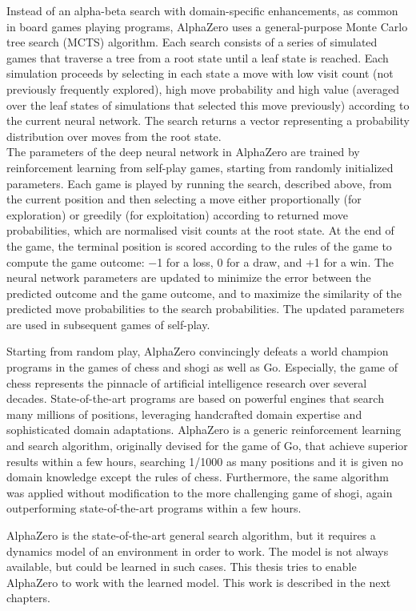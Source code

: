 Instead of an alpha-beta search with domain-specific enhancements, as common in board games playing programs, AlphaZero uses a general-purpose Monte Carlo tree search \cite{Algo.MCTS} (MCTS) algorithm. Each search consists of a series of simulated games that traverse a tree from a root state until a leaf state is reached. Each simulation proceeds by selecting in each state a move with low visit count (not previously frequently explored), high move probability and high value (averaged over the leaf states of simulations that selected this move previously) according to the current neural network. The search returns a vector representing a probability distribution over moves from the root state. \\
The parameters of the deep neural network in AlphaZero are trained by reinforcement learning from self-play games, starting from randomly initialized parameters. Each game is played by running the search, described above, from the current position and then selecting a move either proportionally (for exploration) or greedily (for exploitation) according to returned move probabilities, which are normalised visit counts at the root state. At the end of the game, the terminal position is scored according to the rules of the game to compute the game outcome: −1 for a loss, 0 for a draw, and +1 for a win. The neural network parameters are updated to minimize the error between the predicted outcome and the game outcome, and to maximize the similarity of the predicted move probabilities to the search probabilities. The updated parameters are used in subsequent games of self-play.

Starting from random play, AlphaZero convincingly defeats a world champion programs in the games of chess and shogi as well as Go. Especially, the game of chess represents the pinnacle of artificial intelligence research over several decades. State-of-the-art programs are based on powerful engines that search many millions of positions, leveraging handcrafted domain expertise and sophisticated domain adaptations. AlphaZero is a generic reinforcement learning and search algorithm, originally devised for the game of Go, that achieve superior results within a few hours, searching 1/1000 as many positions and it is given no domain knowledge except the rules of chess. Furthermore, the same algorithm was applied without modification to the more challenging game of shogi, again outperforming state-of-the-art programs within a few hours.

AlphaZero is the state-of-the-art general search algorithm, but it requires a dynamics model of an environment in order to work. The model is not always available, but could be learned in such cases. This thesis tries to enable AlphaZero to work with the learned model. This work is described in the next chapters.


